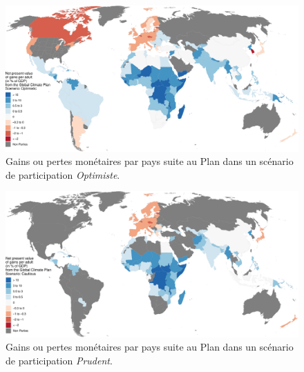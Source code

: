 \documentclass[a5paper,french]{memoir}
\begin{document}
\begin{figure}[h!]
  \caption{Gains ou pertes monétaires par pays suite au Plan dans un scénario de participation \textit{Optimiste}.}\label{fig:gain_optimist}
  \centerline{\includegraphics[width=.85\paperwidth]{../figures/maps/Soptimistic_npv_over_gdp_gcs_adj.pdf}} 
\end{figure}
\begin{figure}[b!]
  \caption{Gains ou pertes monétaires par pays suite au Plan dans un scénario de participation \textit{Prudent}.}\label{fig:gain_prudent}
  \centerline{\includegraphics[width=.85\paperwidth]{../figures/maps/Scautious_npv_over_gdp_gcs_adj.pdf}
    } 
\end{figure}

\end{document}
